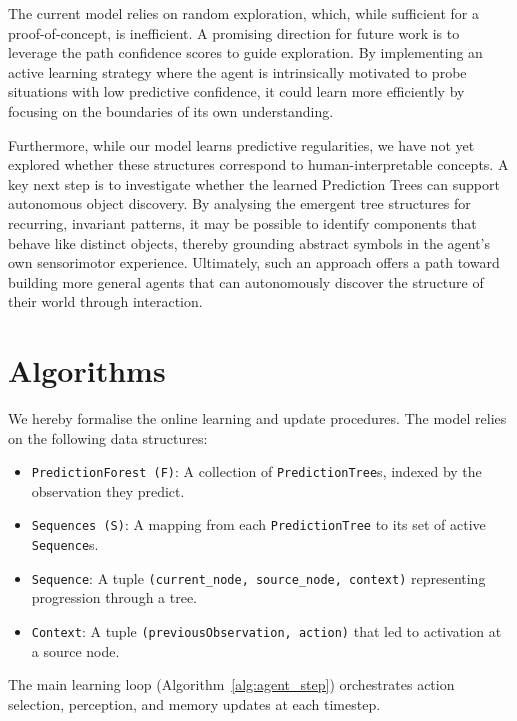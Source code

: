 \documentclass[11pt]{article}
\begin{document}
The current model relies on random exploration, which, while sufficient for a proof-of-concept, is inefficient. A promising direction for future work is to leverage the path confidence scores to guide exploration. By implementing an active learning strategy where the agent is intrinsically motivated to probe situations with low predictive confidence, it could learn more efficiently by focusing on the boundaries of its own understanding.

Furthermore, while our model learns predictive regularities, we have not yet explored whether these structures correspond to human-interpretable concepts. A key next step is to investigate whether the learned Prediction Trees can support autonomous object discovery. By analysing the emergent tree structures for recurring, invariant patterns, it may be possible to identify components that behave like distinct objects, thereby grounding abstract symbols in the agent's own sensorimotor experience. Ultimately, such an approach offers a path toward building more general agents that can autonomously discover the structure of their world through interaction.

\newpage
\printbibliography

\newpage
\appendix

\section{Algorithms}

We hereby formalise the online learning and update procedures. The model relies on the following data structures:
\begin{itemize}[itemsep=0.2em]
\item \texttt{PredictionForest (F)}: A collection of \texttt{PredictionTree}s, indexed by the observation they predict.
\item \texttt{Sequences (S)}: A mapping from each \texttt{PredictionTree} to its set of active \texttt{Sequence}s.
\item \texttt{Sequence}: A tuple \texttt{(current\_node, source\_node, context)} representing progression through a tree.
\item \texttt{Context}: A tuple \texttt{(previousObservation, action)} that led to activation at a source node.
\end{itemize}

The main learning loop (Algorithm~\ref{alg:agent_step}) orchestrates action selection, perception, and memory updates at each timestep.
\end{document}
